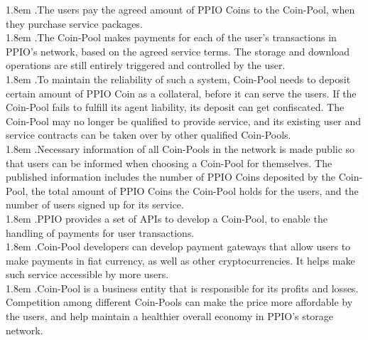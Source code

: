 \documentclass[10pt,a4paper]{article}
\begin{document}
\hangindent 1.8em
.\quad The users pay the agreed amount of PPIO Coins to the Coin-Pool, when they purchase service packages.
  \vspace{-0.8em}
\\

\hangindent 1.8em
.\quad The Coin-Pool makes payments for each of the user’s transactions in PPIO’s network, based on the agreed service terms. The storage and download operations are still entirely triggered and controlled by the user. 
  \vspace{-0.8em}
\\

\hangindent 1.8em
.\quad To maintain the reliability of such a system, Coin-Pool needs to deposit certain amount of PPIO Coin as a collateral, before it can serve the users. If the Coin-Pool fails to fulfill its agent liability, its deposit can get confiscated. The Coin-Pool may no longer be qualified to provide service, and its existing user and service contracts can be taken over by other qualified Coin-Pools.  
  \vspace{-0.8em}
\\

\hangindent 1.8em
.\quad Necessary information of all Coin-Pools in the network is made public so that users can be informed when choosing a Coin-Pool for themselves. The published information includes the number of PPIO Coins deposited by the Coin-Pool, the total amount of PPIO Coins the Coin-Pool holds for the users, and the number of users signed up for its service.
  \vspace{-0.8em}
\\

\hangindent 1.8em
.\quad PPIO provides a set of APIs to develop a Coin-Pool, to enable the handling of payments for user transactions.
  \vspace{-0.8em}
  \\

\hangindent 1.8em
.\quad Coin-Pool developers can develop payment gateways that allow users to make payments in fiat currency, as well as other cryptocurrencies. It helps make such service accessible by more users.
  \vspace{-0.8em}
\\

\hangindent 1.8em
.\quad Coin-Pool is a business entity that is responsible for its profits and losses. Competition among different Coin-Pools can make the price more affordable by the users, and help maintain a healthier overall economy in PPIO’s storage network.
  \vspace{-0.5em}
\end{document}
